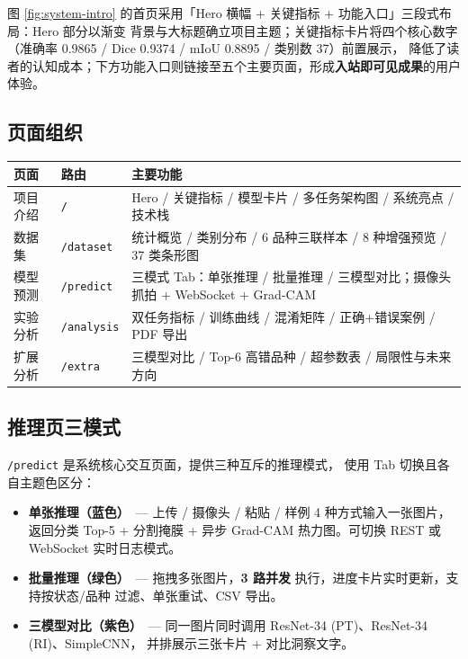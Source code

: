 \documentclass[12pt, a4paper, openany]{ctexbook}
\begin{document}
图 \ref{fig:system-intro} 的首页采用「Hero 横幅 + 关键指标 + 功能入口」三段式布局：Hero 部分以渐变
背景与大标题确立项目主题；关键指标卡片将四个核心数字（准确率 0.9865 / Dice 0.9374 / mIoU 0.8895 / 类别数 37）前置展示，
降低了读者的认知成本；下方功能入口则链接至五个主要页面，形成\textbf{入站即可见成果}的用户体验。

\subsection{页面组织}

\begin{center}
\footnotesize
\begin{tabular}{L{2cm}L{1.8cm}L{9cm}}
  \toprule
  \textbf{页面} & \textbf{路由} & \textbf{主要功能} \\
  \midrule
  项目介绍 & \texttt{/} & Hero / 关键指标 / 模型卡片 / 多任务架构图 / 系统亮点 / 技术栈 \\
  数据集   & \texttt{/dataset} & 统计概览 / 类别分布 / 6 品种三联样本 / 8 种增强预览 / 37 类条形图 \\
  模型预测 & \texttt{/predict} & 三模式 Tab：单张推理 / 批量推理 / 三模型对比；摄像头抓拍 + WebSocket + Grad-CAM \\
  实验分析 & \texttt{/analysis} & 双任务指标 / 训练曲线 / 混淆矩阵 / 正确+错误案例 / PDF 导出 \\
  扩展分析 & \texttt{/extra} & 三模型对比 / Top-6 高错品种 / 超参数表 / 局限性与未来方向 \\
  \bottomrule
\end{tabular}
\end{center}

\subsection{推理页三模式}

\texttt{/predict} 是系统核心交互页面，提供三种互斥的推理模式，
使用 Tab 切换且各自主题色区分：

\begin{itemize}[leftmargin=*]
  \item \textbf{单张推理（蓝色）}\ —
        上传 / 摄像头 / 粘贴 / 样例 4 种方式输入一张图片，返回分类 Top-5
        + 分割掩膜 + 异步 Grad-CAM 热力图。可切换 REST 或 WebSocket 实时日志模式。
  \item \textbf{批量推理（绿色）}\ —
        拖拽多张图片，\textbf{3 路并发} 执行，进度卡片实时更新，支持按状态/品种
        过滤、单张重试、CSV 导出。
  \item \textbf{三模型对比（紫色）}\ —
        同一图片同时调用 ResNet-34 (PT)、ResNet-34 (RI)、SimpleCNN，
        并排展示三张卡片 + 对比洞察文字。
\end{itemize}
\end{document}
